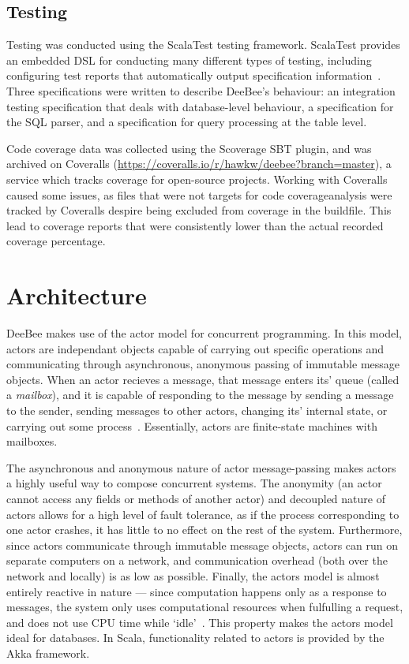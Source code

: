 \subsection{Testing}
\label{par:test}
Testing was conducted using the ScalaTest testing framework. ScalaTest provides an embedded DSL for conducting many different types of testing, including configuring test reports that automatically output specification information~\cite{vennersscalatest}. Three specifications were written to describe DeeBee's behaviour: an integration testing specification that deals with database-level behaviour, a specification for the SQL parser, and a specification for query processing at the table level.

Code coverage data was collected using the Scoverage SBT plugin, and was archived on Coveralls (\url{https://coveralls.io/r/hawkw/deebee?branch=master}), a service which tracks coverage for open-source projects. Working with Coveralls caused some issues, as files that were not targets for code coverageanalysis were tracked by Coveralls despire being excluded from coverage in the buildfile. This lead to coverage reports that were consistently lower than the actual recorded coverage percentage.

\section{Architecture}
\label{sec:arch}

DeeBee makes use of the actor model for concurrent programming. In this model, actors are independant objects capable of carrying out specific operations and communicating through asynchronous, anonymous passing of immutable message objects. When an actor recieves a message, that message enters its' queue (called a \textit{mailbox}), and it is capable of responding to the message by sending a message to the sender, sending messages to other actors, changing its' internal state, or carrying out some process~\cite{agha1985actors,haller2012integration,odersky2004scala}. Essentially, actors are finite-state machines with mailboxes.

The asynchronous and anonymous nature of actor message-passing makes actors a highly useful way to compose concurrent systems. The anonymity (an actor cannot access any fields or methods of another actor) and decoupled nature of actors allows for a high level of fault tolerance, as if the process corresponding to one actor crashes, it has little to no effect on the rest of the system. Furthermore, since actors communicate through immutable message objects, actors can run on separate computers on a network, and communication overhead (both over the network and locally) is as low as possible. Finally, the actors model is almost entirely reactive in nature --- since computation happens only as a response to messages, the system only uses computational resources when fulfulling a request, and does not use CPU time while `idle'~\cite{agha1985actors,haller2012integration,odersky2004scala}. This property makes the actors model ideal for databases. In Scala, functionality related to actors is provided by the Akka framework.

